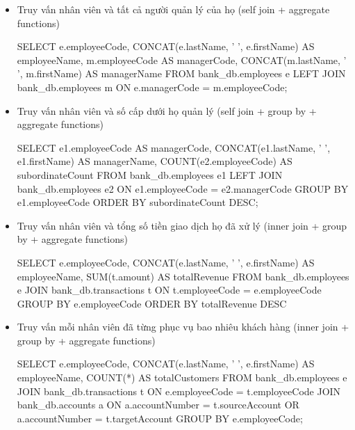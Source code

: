 \begin{itemize}

   \item Truy vấn nhân viên và tất cả người quản lý của họ (self join + aggregate functions)
    \begin{MySQLCode}
    SELECT 
        e.employeeCode,
        CONCAT(e.lastName, ' ', e.firstName) AS employeeName,
        m.employeeCode AS managerCode,
        CONCAT(m.lastName, ' ', m.firstName) AS managerName
    FROM 
        bank_db.employees e
    LEFT JOIN 
        bank_db.employees m ON e.managerCode = m.employeeCode;
    \end{MySQLCode}

    \item Truy vấn nhân viên và số cấp dưới họ quản lý (self join + group by + aggregate functions)
    \begin{MySQLCode}
    SELECT 
        e1.employeeCode AS managerCode,
        CONCAT(e1.lastName, ' ', e1.firstName) AS managerName,
        COUNT(e2.employeeCode) AS subordinateCount
    FROM 
        bank_db.employees e1
    LEFT JOIN 
        bank_db.employees e2 ON e1.employeeCode = e2.managerCode
    GROUP BY 
        e1.employeeCode
    ORDER BY 
        subordinateCount DESC;
    \end{MySQLCode}

    \item Truy vấn nhân viên và tổng số tiền giao dịch họ đã xử lý (inner join + group by + aggregate functions)
    \begin{MySQLCode}
    SELECT 
        e.employeeCode,
        CONCAT(e.lastName, ' ', e.firstName) AS employeeName,
	SUM(t.amount) AS totalRevenue
    FROM 
        bank_db.employees e
    JOIN 
        bank_db.transactions t ON t.employeeCode = e.employeeCode
    GROUP BY 
        e.employeeCode
    ORDER BY 
        totalRevenue DESC
    \end{MySQLCode}

    \item Truy vấn mỗi nhân viên đã từng phục vụ bao nhiêu khách hàng (inner join + group by + aggregate functions)
    \begin{MySQLCode}
    SELECT 
        e.employeeCode,
        CONCAT(e.lastName, ' ', e.firstName) AS employeeName,
        COUNT(*) AS totalCustomers
    FROM
	bank_db.employees e
    JOIN
        bank_db.transactions t ON e.employeeCode = t.employeeCode
    JOIN 
        bank_db.accounts a ON a.accountNumber = t.sourceAccount OR a.accountNumber = t.targetAccount
    GROUP BY 
        e.employeeCode;
    \end{MySQLCode}

\end{itemize}
